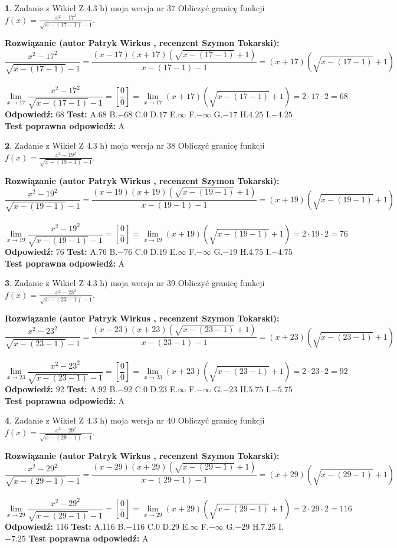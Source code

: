 \documentclass[12pt, a4paper]{article}
\theoremstyle{definition} %
\newtheorem{zad}{}
\newcommand{\zadStart}[1]{\begin{zad}#1\newline}
\newcommand{\zadStop}{\end{zad}}
\newcommand{\rozwStart}[2]{\noindent \textbf{Rozwiązanie (autor #1 , recenzent #2): }\newline}
\newcommand{\rozwStop}{\newline}
\newcommand{\odpStart}{\noindent \textbf{Odpowiedź:}\newline}
\newcommand{\odpStop}{\newline}
\newcommand{\testStart}{\noindent \textbf{Test:}\newline}
\newcommand{\testStop}{\newline}
\newcommand{\kluczStart}{\noindent \textbf{Test poprawna odpowiedź:}\newline}
\newcommand{\kluczStop}{\newline}
\begin{document}
\zadStart{Zadanie z Wikieł Z 4.3 h) moja wersja nr 37}
Obliczyć granicę funkcji $f(x)=\frac{x^{2} - 17^{2}}{\sqrt{x-(17-1)}-1}$.
\zadStop
\rozwStart{Patryk Wirkus}{Szymon Tokarski}
$$\frac{x^{2} - 17^{2}}{\sqrt{x-(17-1)}-1}=\frac{(x-17)(x+17)(\sqrt{x-(17-1)}+1)}{x-(17-1)-1}=(x+17)(\sqrt{x-(17-1)}+1)$$
\\
$$\lim\limits_{x\to 17}\frac{x^{2} - 17^{2}}{\sqrt{x-(17-1)}-1}=[\frac{0}{0}]=
\lim\limits_{x\to 17}(x+17)(\sqrt{x-(17-1)}+1) = 2\cdot17 \cdot 2 = 68$$
\rozwStop
\odpStart
$68$
\odpStop
\testStart
A.$68$
B.$-68$
C.$0$
D.$17$
E.$\infty$
F.$-\infty$
G.$-17$
H.$4.25$
I.$-4.25$
\testStop
\kluczStart
A
\kluczStop



\zadStart{Zadanie z Wikieł Z 4.3 h) moja wersja nr 38}
Obliczyć granicę funkcji $f(x)=\frac{x^{2} - 19^{2}}{\sqrt{x-(19-1)}-1}$.
\zadStop
\rozwStart{Patryk Wirkus}{Szymon Tokarski}
$$\frac{x^{2} - 19^{2}}{\sqrt{x-(19-1)}-1}=\frac{(x-19)(x+19)(\sqrt{x-(19-1)}+1)}{x-(19-1)-1}=(x+19)(\sqrt{x-(19-1)}+1)$$
\\
$$\lim\limits_{x\to 19}\frac{x^{2} - 19^{2}}{\sqrt{x-(19-1)}-1}=[\frac{0}{0}]=
\lim\limits_{x\to 19}(x+19)(\sqrt{x-(19-1)}+1) = 2\cdot19 \cdot 2 = 76$$
\rozwStop
\odpStart
$76$
\odpStop
\testStart
A.$76$
B.$-76$
C.$0$
D.$19$
E.$\infty$
F.$-\infty$
G.$-19$
H.$4.75$
I.$-4.75$
\testStop
\kluczStart
A
\kluczStop



\zadStart{Zadanie z Wikieł Z 4.3 h) moja wersja nr 39}
Obliczyć granicę funkcji $f(x)=\frac{x^{2} - 23^{2}}{\sqrt{x-(23-1)}-1}$.
\zadStop
\rozwStart{Patryk Wirkus}{Szymon Tokarski}
$$\frac{x^{2} - 23^{2}}{\sqrt{x-(23-1)}-1}=\frac{(x-23)(x+23)(\sqrt{x-(23-1)}+1)}{x-(23-1)-1}=(x+23)(\sqrt{x-(23-1)}+1)$$
\\
$$\lim\limits_{x\to 23}\frac{x^{2} - 23^{2}}{\sqrt{x-(23-1)}-1}=[\frac{0}{0}]=
\lim\limits_{x\to 23}(x+23)(\sqrt{x-(23-1)}+1) = 2\cdot23 \cdot 2 = 92$$
\rozwStop
\odpStart
$92$
\odpStop
\testStart
A.$92$
B.$-92$
C.$0$
D.$23$
E.$\infty$
F.$-\infty$
G.$-23$
H.$5.75$
I.$-5.75$
\testStop
\kluczStart
A
\kluczStop



\zadStart{Zadanie z Wikieł Z 4.3 h) moja wersja nr 40}
Obliczyć granicę funkcji $f(x)=\frac{x^{2} - 29^{2}}{\sqrt{x-(29-1)}-1}$.
\zadStop
\rozwStart{Patryk Wirkus}{Szymon Tokarski}
$$\frac{x^{2} - 29^{2}}{\sqrt{x-(29-1)}-1}=\frac{(x-29)(x+29)(\sqrt{x-(29-1)}+1)}{x-(29-1)-1}=(x+29)(\sqrt{x-(29-1)}+1)$$
\\
$$\lim\limits_{x\to 29}\frac{x^{2} - 29^{2}}{\sqrt{x-(29-1)}-1}=[\frac{0}{0}]=
\lim\limits_{x\to 29}(x+29)(\sqrt{x-(29-1)}+1) = 2\cdot29 \cdot 2 = 116$$
\rozwStop
\odpStart
$116$
\odpStop
\testStart
A.$116$
B.$-116$
C.$0$
D.$29$
E.$\infty$
F.$-\infty$
G.$-29$
H.$7.25$
I.$-7.25$
\testStop
\kluczStart
A
\kluczStop
\end{document}
